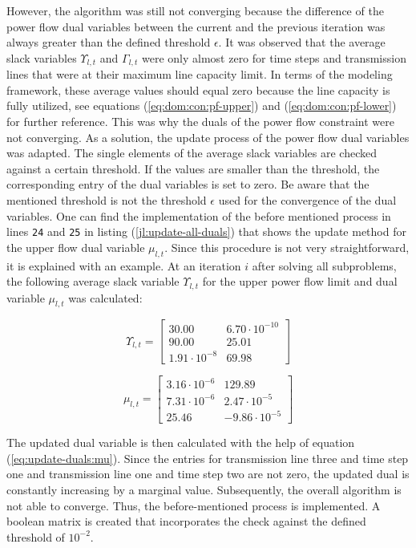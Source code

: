 However, the algorithm was still not converging because the difference of the power flow dual variables between the current and the previous iteration was always greater than the defined threshold $\epsilon$. It was observed that the average slack variables $\Upsilon_{l,t}$ and $\Gamma_{l,t}$ were only almost zero for time steps and transmission lines that were at their maximum line capacity limit. In terms of the modeling framework, these average values should equal zero because the line capacity is fully utilized, see equations (\ref{eq:dom:con:pf-upper}) and (\ref{eq:dom:con:pf-lower}) for further reference. This was why the duals of the power flow constraint were not converging. As a solution, the update process of the power flow dual variables was adapted. The single elements of the average slack variables are checked against a certain threshold. If the values are smaller than the threshold, the corresponding entry of the dual variables is set to zero. Be aware that the mentioned threshold is not the threshold $\epsilon$ used for the convergence of the dual variables. One can find the implementation of the before mentioned process in lines \texttt{24} and \texttt{25} in listing (\ref{jl:update-all-duals}) that shows the update method for the upper flow dual variable $\mu_{l,t}$. Since this procedure is not very straightforward, it is explained with an example. At an iteration $i$ after solving all subproblems, the following average slack variable $\Upsilon_{l,t}$ for the upper power flow limit and dual variable $\mu_{l,t}$ was calculated:

\begin{equation}
	\Upsilon_{l,t} = \begin{bmatrix}
			30.00 & 6.70 \cdot 10^{-10} \\
			90.00 & 25.01 \\
			1.91 \cdot 10^{-8} & 69.98
		\end{bmatrix}
\end{equation}

\begin{equation}
	\mu_{l,t} = \begin{bmatrix}
			3.16 \cdot 10^{-6} & 129.89 \\
			7.31 \cdot 10^{-6} & 2.47 \cdot 10^{-5} \\
			25.46 & -9.86 \cdot 10^{-5}
		\end{bmatrix}
\end{equation}

The updated dual variable is then calculated with the help of equation (\ref{eq:update-duals:mu}). Since the entries for transmission line three and time step one and transmission line one and time step two are not zero, the updated dual is constantly increasing by a marginal value. Subsequently, the overall algorithm is not able to converge. Thus, the before-mentioned process is implemented. A boolean matrix is created that incorporates the check against the defined threshold of $10^{-2}$.

